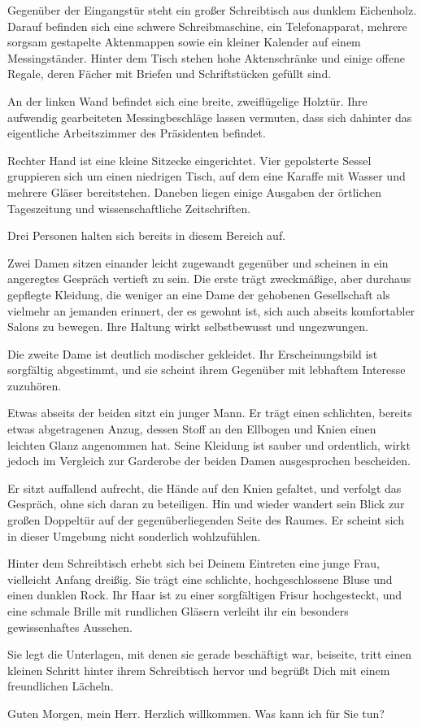 \begin{vorlesetext}
Gegenüber der Eingangstür steht ein gro\ss{}er Schreibtisch aus dunklem Eichenholz. Darauf befinden sich eine schwere Schreibmaschine, ein Telefonapparat, mehrere sorgsam gestapelte Aktenmappen sowie ein kleiner Kalender auf einem Messingständer. Hinter dem Tisch stehen hohe Aktenschränke und einige offene Regale, deren Fächer mit Briefen und Schriftstücken gefüllt sind.

An der linken Wand befindet sich eine breite, zweiflügelige Holztür. Ihre aufwendig gearbeiteten Messingbeschläge lassen vermuten, dass sich dahinter das eigentliche Arbeitszimmer des Präsidenten befindet.

Rechter Hand ist eine kleine Sitzecke eingerichtet. Vier gepolsterte Sessel gruppieren sich um einen niedrigen Tisch, auf dem eine Karaffe mit Wasser und mehrere Gläser bereitstehen. Daneben liegen einige Ausgaben der örtlichen Tageszeitung und wissenschaftliche Zeitschriften.

Drei Personen halten sich bereits in diesem Bereich auf.

Zwei Damen sitzen einander leicht zugewandt gegenüber und scheinen in ein angeregtes Gespräch vertieft zu sein. Die erste trägt zweckmä\ss{}ige, aber durchaus gepflegte Kleidung, die weniger an eine Dame der gehobenen Gesellschaft als vielmehr an jemanden erinnert, der es gewohnt ist, sich auch abseits komfortabler Salons zu bewegen. Ihre Haltung wirkt selbstbewusst und ungezwungen.

Die zweite Dame ist deutlich modischer gekleidet. Ihr Erscheinungsbild ist sorgfältig abgestimmt, und sie scheint ihrem Gegenüber mit lebhaftem Interesse zuzuhören.

Etwas abseits der beiden sitzt ein junger Mann. Er trägt einen schlichten, bereits etwas abgetragenen Anzug, dessen Stoff an den Ellbogen und Knien einen leichten Glanz angenommen hat. Seine Kleidung ist sauber und ordentlich, wirkt jedoch im Vergleich zur Garderobe der beiden Damen ausgesprochen bescheiden.

Er sitzt auffallend aufrecht, die Hände auf den Knien gefaltet, und verfolgt das Gespräch, ohne sich daran zu beteiligen. Hin und wieder wandert sein Blick zur gro\ss{}en Doppeltür auf der gegenüberliegenden Seite des Raumes. Er scheint sich in dieser Umgebung nicht sonderlich wohlzufühlen.

Hinter dem Schreibtisch erhebt sich bei Deinem Eintreten eine junge Frau, vielleicht Anfang drei\ss{}ig. Sie trägt eine schlichte, hochgeschlossene Bluse und einen dunklen Rock. Ihr Haar ist zu einer sorgfältigen Frisur hochgesteckt, und eine schmale Brille mit rundlichen Gläsern verleiht ihr ein besonders gewissenhaftes Aussehen.

Sie legt die Unterlagen, mit denen sie gerade beschäftigt war, beiseite, tritt einen kleinen Schritt hinter ihrem Schreibtisch hervor und begrü\ss{}t Dich mit einem freundlichen Lächeln.

\glqq{}Guten Morgen, mein Herr. Herzlich willkommen. Was kann ich für Sie tun?\grqq{}
\end{vorlesetext}

